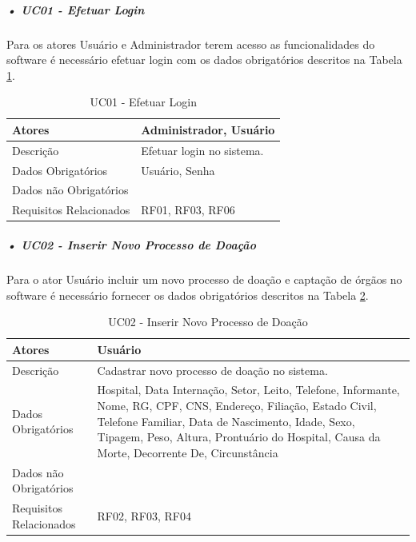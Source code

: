 \documentclass[portuguese,oneside]{tcc}
\begin{document}
\subparagraph{• UC01 - Efetuar Login}\label{tab:uc-login}
Para os atores Usuário e Administrador terem acesso as funcionalidades do software é necessário efetuar login com os dados obrigatórios descritos na Tabela \ref{table:uc01}.


\begin{table}
  \centering
  \caption{UC01 - Efetuar Login} \label{table:uc01}
\begin{tabular}{ |p{5cm}|p{5cm}|  }

\hline
Atores & 
Administrador, Usuário \\

\hline
Descrição & 
Efetuar login no sistema. \\

\hline
Dados Obrigatórios & Usuário, Senha
 \\

\hline
Dados não Obrigatórios & 
 \\

\hline
Requisitos Relacionados & RF01, RF03, RF06
 \\

\hline

\end{tabular}

\end{table}



\subparagraph{• UC02 - Inserir Novo Processo de Doação} \label{tab:uc-inserir}
Para o ator Usuário incluir um novo processo de doação e captação de órgãos no software é necessário fornecer os dados obrigatórios descritos na Tabela \ref{table:uc02}.

\begin{table}
	\centering
	\caption{UC02 - Inserir Novo Processo de Doação} \label{table:uc02}
		\begin{tabular}{ |p{5cm}|p{5cm}|  }
\hline
Atores & 
Usuário\\

\hline
Descrição & 
Cadastrar novo processo de doação no sistema. \\

\hline
Dados Obrigatórios & 
Hospital, Data Internação, Setor, Leito, Telefone, Informante, Nome, RG, CPF, CNS, Endereço, Filiação, Estado Civil, Telefone Familiar, Data de Nascimento, Idade, Sexo, Tipagem, Peso, Altura, Prontuário do Hospital, Causa da Morte, Decorrente De, Circunstância
 \\

\hline
Dados não Obrigatórios & 

 \\

\hline
Requisitos Relacionados & 
RF02, RF03, RF04
 \\
 
 \hline
		\end{tabular}
\end{table}
\end{document}
